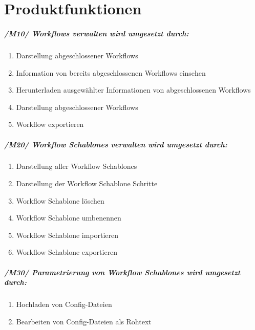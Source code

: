 \chapter{Produktfunktionen}

\paragraph{/M10/ \textit{\glspl{Workflow} verwalten} wird umgesetzt durch:}


\renewcommand{\labelenumi}{/FA\arabic{enumi}0/}
\begin{enumerate}
    \setlength\itemsep{-1em}    
    \item Darstellung abgeschlossener \glspl{Workflow}
    \item Information von bereits abgeschlossenen \glspl{Workflow} einsehen
    \item Herunterladen ausgewählter Informationen von abgeschlossenen \glspl{Workflow}
    \item Darstellung abgeschlossener \glspl{Workflow}
    \item \gls{Workflow} exportieren
    \setcounter{FAs}{\value{enumi}}
\end{enumerate}

\paragraph{/M20/ \textit{\glspl{Workflow Schablone} verwalten} wird umgesetzt durch:}
\begin{enumerate}
    \setlength\itemsep{-1em}
    \setcounter{enumi}{\value{FAs}}
    \item Darstellung aller \glspl{Workflow Schablone}
    \item Darstellung der \gls{Workflow Schablone} Schritte
    \item \gls{Workflow Schablone} löschen
    \item \gls{Workflow Schablone} umbenennen
        \item \gls{Workflow Schablone} importieren
    \item \gls{Workflow Schablone} exportieren
    \setcounter{FAs}{\value{enumi}}
\end{enumerate}

\paragraph{/M30/ \textit{Parametrierung von \glspl{Workflow Schablone}} wird umgesetzt durch:}
\begin{enumerate}
    \setlength\itemsep{-1em}
    \setcounter{enumi}{\value{FAs}}
    \item Hochladen von Config-Dateien
    \item Bearbeiten von Config-Dateien als Rohtext
    \setcounter{FAs}{\value{enumi}}
\end{enumerate}

